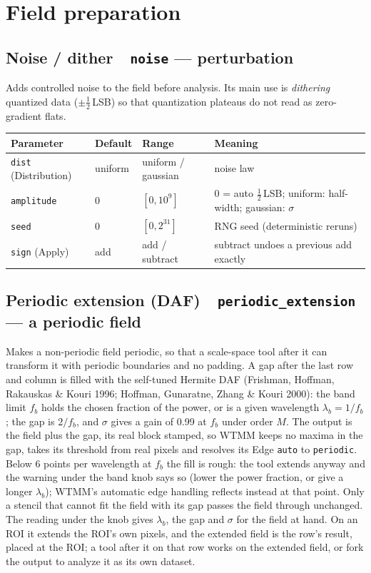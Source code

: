 \documentclass[10pt]{article}
\newcommand{\dev}[1]{\texttt{#1}}
\newcommand{\tool}[2]{#1~\textperiodcentered~\dev{#2}}
\begin{document}
\section{Field preparation}

\subsection{\tool{Noise / dither}{noise} --- perturbation}
Adds controlled noise to the field before analysis. Its main use is \emph{dithering}
quantized data ($\pm\tfrac12$\,LSB) so that quantization plateaus do not read as
zero-gradient flats.

\begin{longtable}{L l l M}
\toprule Parameter & Default & Range & Meaning \\ \midrule
\texttt{dist} (Distribution) & uniform & uniform / gaussian & noise law \\
\texttt{amplitude} & 0 & $[0,10^9]$ & $0$ = auto $\tfrac12$\,LSB; uniform: half-width; gaussian: $\sigma$ \\
\texttt{seed} & 0 & $[0,2^{31}]$ & RNG seed (deterministic reruns) \\
\texttt{sign} (Apply) & add & add / subtract & subtract undoes a previous add exactly \\
\bottomrule
\end{longtable}

\subsection{\tool{Periodic extension (DAF)}{periodic\_extension} --- a periodic field}\label{sec:periodic-extension}
Makes a non-periodic field periodic, so that a scale-space tool after it can transform it with periodic
boundaries and no padding. A gap after the last row and column is filled with the self-tuned Hermite DAF
(Frishman, Hoffman, Rakauskas \& Kouri 1996; Hoffman, Gunaratne, Zhang \& Kouri 2000): the band limit
$f_b$ holds the chosen fraction of the power, or is a given wavelength $\lambda_b = 1/f_b$; the gap is
$2/f_b$, and $\sigma$ gives a gain of 0.99 at $f_b$ under order $M$. The output is the field plus the gap,
its real block stamped, so WTMM keeps no maxima in the gap, takes its threshold from real pixels and
resolves its Edge \texttt{auto} to \texttt{periodic}. Below 6 points per wavelength at $f_b$ the fill is
rough: the tool extends anyway and the warning under the band knob says so (lower the power fraction, or
give a longer $\lambda_b$); WTMM's automatic edge handling reflects instead at that point. Only a stencil
that cannot fit the field with its gap passes the field through unchanged. The reading under the knob
gives $\lambda_b$, the gap and $\sigma$ for the field at hand. On an ROI it extends the ROI's own pixels, and the extended field is the row's result, placed at the ROI; a tool after it on that row works on the extended field, or fork the output to analyze it as its own dataset.
\end{document}
